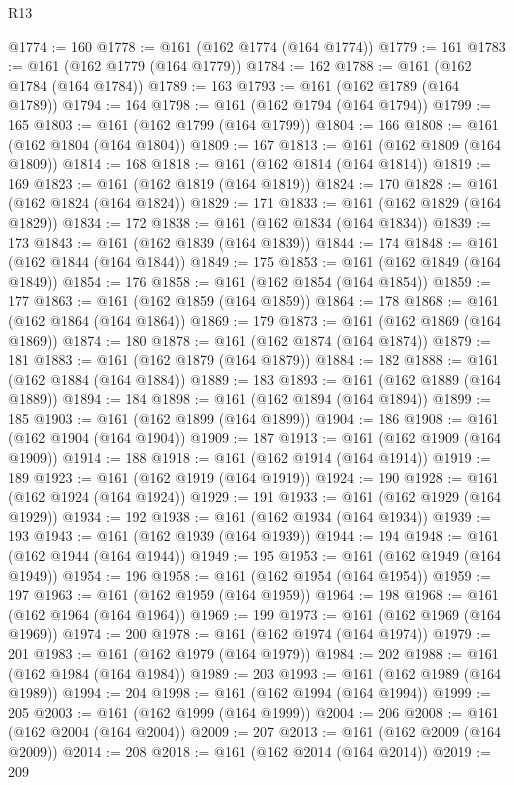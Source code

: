 \begin{lexlean}{R13}
\begin{coremodule}
@1774 := 160
@1778 := @161 (@162 @1774 (@164 @1774))
@1779 := 161
@1783 := @161 (@162 @1779 (@164 @1779))
@1784 := 162
@1788 := @161 (@162 @1784 (@164 @1784))
@1789 := 163
@1793 := @161 (@162 @1789 (@164 @1789))
@1794 := 164
@1798 := @161 (@162 @1794 (@164 @1794))
@1799 := 165
@1803 := @161 (@162 @1799 (@164 @1799))
@1804 := 166
@1808 := @161 (@162 @1804 (@164 @1804))
@1809 := 167
@1813 := @161 (@162 @1809 (@164 @1809))
@1814 := 168
@1818 := @161 (@162 @1814 (@164 @1814))
@1819 := 169
@1823 := @161 (@162 @1819 (@164 @1819))
@1824 := 170
@1828 := @161 (@162 @1824 (@164 @1824))
@1829 := 171
@1833 := @161 (@162 @1829 (@164 @1829))
@1834 := 172
@1838 := @161 (@162 @1834 (@164 @1834))
@1839 := 173
@1843 := @161 (@162 @1839 (@164 @1839))
@1844 := 174
@1848 := @161 (@162 @1844 (@164 @1844))
@1849 := 175
@1853 := @161 (@162 @1849 (@164 @1849))
@1854 := 176
@1858 := @161 (@162 @1854 (@164 @1854))
@1859 := 177
@1863 := @161 (@162 @1859 (@164 @1859))
@1864 := 178
@1868 := @161 (@162 @1864 (@164 @1864))
@1869 := 179
@1873 := @161 (@162 @1869 (@164 @1869))
@1874 := 180
@1878 := @161 (@162 @1874 (@164 @1874))
@1879 := 181
@1883 := @161 (@162 @1879 (@164 @1879))
@1884 := 182
@1888 := @161 (@162 @1884 (@164 @1884))
@1889 := 183
@1893 := @161 (@162 @1889 (@164 @1889))
@1894 := 184
@1898 := @161 (@162 @1894 (@164 @1894))
@1899 := 185
@1903 := @161 (@162 @1899 (@164 @1899))
@1904 := 186
@1908 := @161 (@162 @1904 (@164 @1904))
@1909 := 187
@1913 := @161 (@162 @1909 (@164 @1909))
@1914 := 188
@1918 := @161 (@162 @1914 (@164 @1914))
@1919 := 189
@1923 := @161 (@162 @1919 (@164 @1919))
@1924 := 190
@1928 := @161 (@162 @1924 (@164 @1924))
@1929 := 191
@1933 := @161 (@162 @1929 (@164 @1929))
@1934 := 192
@1938 := @161 (@162 @1934 (@164 @1934))
@1939 := 193
@1943 := @161 (@162 @1939 (@164 @1939))
@1944 := 194
@1948 := @161 (@162 @1944 (@164 @1944))
@1949 := 195
@1953 := @161 (@162 @1949 (@164 @1949))
@1954 := 196
@1958 := @161 (@162 @1954 (@164 @1954))
@1959 := 197
@1963 := @161 (@162 @1959 (@164 @1959))
@1964 := 198
@1968 := @161 (@162 @1964 (@164 @1964))
@1969 := 199
@1973 := @161 (@162 @1969 (@164 @1969))
@1974 := 200
@1978 := @161 (@162 @1974 (@164 @1974))
@1979 := 201
@1983 := @161 (@162 @1979 (@164 @1979))
@1984 := 202
@1988 := @161 (@162 @1984 (@164 @1984))
@1989 := 203
@1993 := @161 (@162 @1989 (@164 @1989))
@1994 := 204
@1998 := @161 (@162 @1994 (@164 @1994))
@1999 := 205
@2003 := @161 (@162 @1999 (@164 @1999))
@2004 := 206
@2008 := @161 (@162 @2004 (@164 @2004))
@2009 := 207
@2013 := @161 (@162 @2009 (@164 @2009))
@2014 := 208
@2018 := @161 (@162 @2014 (@164 @2014))
@2019 := 209

\end{coremodule}
\end{lexlean}
